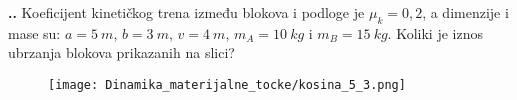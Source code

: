 
\noindent 
\textbf{
\thecjelina.\thezadatak.}
Koeficijent kinetičkog trena između blokova i podloge je $\mu_k=0,2$, a dimenzije i mase su: $a=5\ m$, $b=3\ m$, $v=4\ m$, $m_A=10\ kg$ i $m_B=15\ kg$.
Koliki je iznos ubrzanja blokova prikazanih na slici?
\begin{figure}[h]%
  \begin{center}
    \texttt{[image: Dinamika\_materijalne\_tocke/kosina\_5\_3.png]}
  \end{center}
\end{figure}

